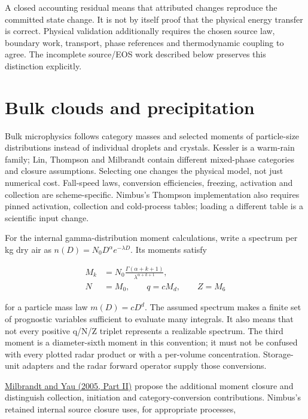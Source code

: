 \documentclass[
  11pt,
]{report}
\begin{document}
A closed accounting residual means that attributed changes reproduce the
committed state change. It is not by itself proof that the physical
energy transfer is correct. Physical validation additionally requires
the chosen source law, boundary work, transport, phase references and
thermodynamic coupling to agree. The incomplete source/EOS work
described below preserves this distinction explicitly.

\section{Bulk clouds and
precipitation}\label{bulk-clouds-and-precipitation}

Bulk microphysics follows category masses and selected moments of
particle-size distributions instead of individual droplets and crystals.
Kessler is a warm-rain family; Lin, Thompson and Milbrandt contain
different mixed-phase categories and closure assumptions. Selecting one
changes the physical model, not just numerical cost. Fall-speed laws,
conversion efficiencies, freezing, activation and collection are
scheme-specific. Nimbus's Thompson implementation also requires pinned
activation, collection and cold-process tables; loading a different
table is a scientific input change.

For the internal gamma-distribution moment calculations, write a
spectrum per kg dry air as \(n(D)=N_0D^\alpha e^{-\lambda D}\). Its
moments satisfy

\[\begin{aligned}
M_k &= N_0\frac{\Gamma(\alpha+k+1)}{\lambda^{\alpha+k+1}}, \\
N &= M_0,\qquad q=cM_d,\qquad Z=M_6
\end{aligned}\]

for a particle mass law \(m(D)=cD^d\). The assumed spectrum makes a
finite set of prognostic variables sufficient to evaluate many
integrals. It also means that not every positive q/N/Z triplet
represents a realizable spectrum. The third moment is a diameter-sixth
moment in this convention; it must not be confused with every plotted
radar product or with a per-volume concentration. Storage-unit adapters
and the radar forward operator supply those conversions.

\href{https://www2.mmm.ucar.edu/wrf/users/physics/phys_refs/MICRO_PHYS/Milbrandt_Yau_part2.pdf}{Milbrandt
and Yau (2005, Part II)} propose the additional moment closure and
distinguish collection, initiation and category-conversion
contributions. Nimbus's retained internal source closure uses, for
appropriate processes,
\end{document}
